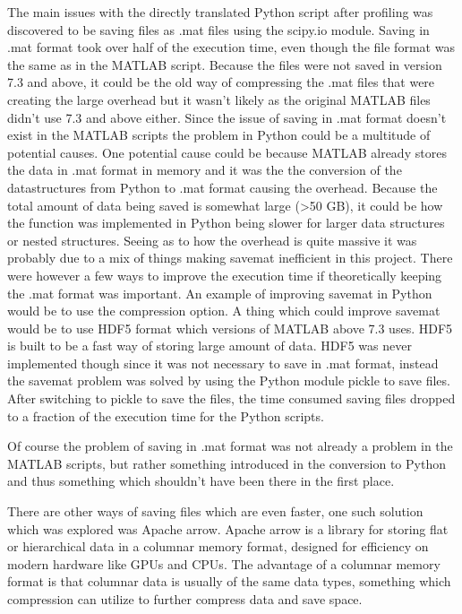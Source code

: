 \documentclass[12pt, a4paper]{article}
\begin{document}
The main issues with the directly translated Python script after profiling was discovered to be saving files as .mat files using the scipy.io module.
Saving in .mat format took over half of the execution time, even though the file format was the same as in the MATLAB script.
Because the files were not saved in version 7.3 and above, it could be the old way of compressing the .mat files that were creating the large overhead but it wasn't likely as the original MATLAB files didn't use 7.3 and above either.
Since the issue of saving in .mat format doesn't exist in the MATLAB scripts the problem in Python could be a multitude of potential causes.
One potential cause could be because MATLAB already stores the data in .mat format in memory and it was the the conversion of the datastructures from Python to .mat format causing the overhead.
Because the total amount of data being saved is somewhat large (>50 GB), it could be how the function was implemented in Python being slower for larger data structures or nested structures. 
Seeing as to how the overhead is quite massive it was probably due to a mix of things making savemat inefficient in this project.
There were however a few ways to improve the execution time if theoretically keeping the .mat format was important.
An example of improving savemat in Python would be to use the compression option.
A thing which could improve savemat would be to use HDF5 format which versions of MATLAB above 7.3 uses. 
HDF5 is built to be a fast way of storing large amount of data.
HDF5 was never implemented though since it was not necessary to save in .mat format, instead the savemat problem was solved by using the Python module pickle to save files.
After switching to pickle to save the files, the time consumed saving files dropped to a fraction of the execution time for the Python scripts.

Of course the problem of saving in .mat format was not already a problem in the MATLAB scripts, but rather something introduced in the conversion to Python and thus something which shouldn't have been there in the first place.

There are other ways of saving files which are even faster, one such solution which was explored was Apache arrow. 
Apache arrow is a library for storing flat or hierarchical data in a columnar memory format, designed for efficiency on modern hardware like GPUs and CPUs.
The advantage of a columnar memory format is that columnar data is usually of the same data types, something which compression can utilize to further compress data and save space.
\end{document}
